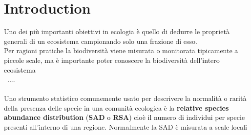 \chapter{Introduction}\label{ch:introduction}
Uno dei più importanti obiettivi in ecologia è quello di dedurre le proprietà generali di un ecosistema campionando solo una frazione di esso. \\
Per ragioni pratiche la biodiversità viene misurata o monitorata tipicamente a piccole scale, ma è importante poter conoscere la biodiversità dell'intero ecosistema 
\\\
....
\\\\
Uno strumento statistico comunemente usato per descrivere la normalità o rarità della presenza delle specie in una comunità ecologica è la \textbf{relative species abundance distribution} (\textbf{SAD} o \textbf{RSA}) cioè il numero di individui per specie presenti all'interno di una regione. Normalmente la SAD è misurata a scale locali



